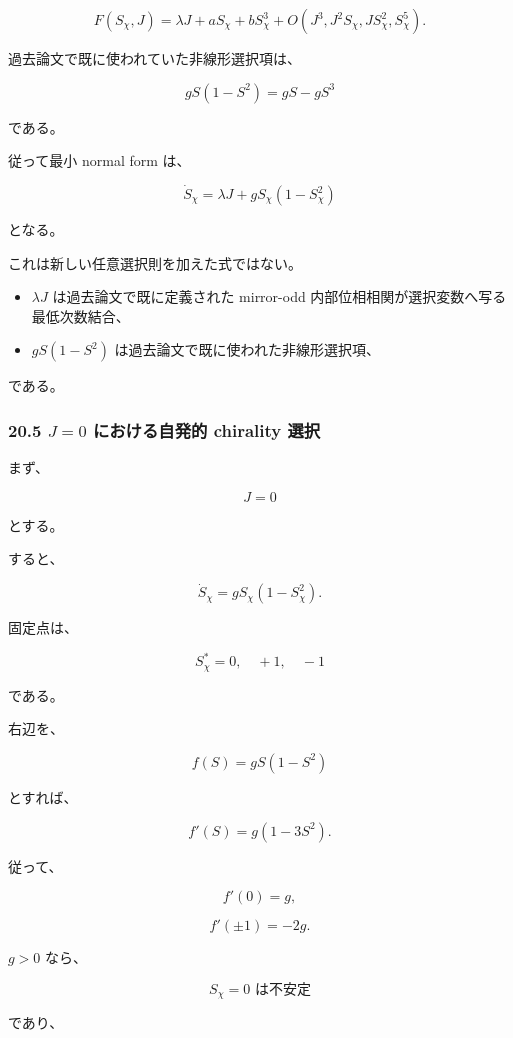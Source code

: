 \documentclass[
  a4paper,
]{ltjsarticle}
\providecommand{\tightlist}{%
  \setlength{\itemsep}{0pt}\setlength{\parskip}{0pt}}
\begin{document}
\[
F(S_\chi,J)
=
\lambda J
+
aS_\chi
+
bS_\chi^3
+
O(J^3,J^2S_\chi,JS_\chi^2,S_\chi^5).
\tag{161}
\]

過去論文で既に使われていた非線形選択項は、

\[
gS(1-S^2)
=
gS-gS^3
\]

である。

従って最小 normal form は、

\[
\boxed{
\dot S_\chi
=
\lambda J
+
gS_\chi
\left(
1-S_\chi^2
\right)
}
\tag{162}
\]

となる。

これは新しい任意選択則を加えた式ではない。

\begin{itemize}
\tightlist
\item
  \(\lambda J\) は過去論文で既に定義された mirror-odd
  内部位相相関が選択変数へ写る最低次数結合、
\item
  \(gS(1-S^2)\) は過去論文で既に使われた非線形選択項、
\end{itemize}

である。

\subsubsection{\texorpdfstring{20.5 \(J=0\) における自発的 chirality
選択}{20.5 J=0 における自発的 chirality 選択}}\label{j0-ux306bux304aux3051ux308bux81eaux767aux7684-chirality-ux9078ux629e}

まず、

\[
J=0
\]

とする。

すると、

\[
\dot S_\chi
=
gS_\chi(1-S_\chi^2).
\tag{163}
\]

固定点は、

\[
\boxed{
S_\chi^*=0,\quad +1,\quad -1
}
\tag{164}
\]

である。

右辺を、

\[
f(S)=gS(1-S^2)
\]

とすれば、

\[
f'(S)
=
g(1-3S^2).
\]

従って、

\[
f'(0)=g,
\]

\[
f'(\pm1)=-2g.
\]

\(g>0\) なら、

\[
\boxed{
S_\chi=0
\text{ は不安定}
}
\tag{165}
\]

であり、
\end{document}
